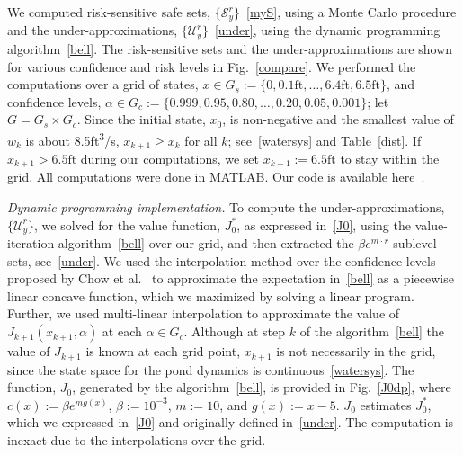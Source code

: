 \documentclass[letterpaper, 10 pt, conference]{ieeeconf}  %
\begin{document}
We computed risk-sensitive safe sets, $\{\mathcal{S}_y^r\}$~\eqref{myS}, using a Monte Carlo procedure 
and the under-approximations, $\{\mathcal{U}_y^r\}$~\eqref{under}, using the dynamic programming algorithm~\eqref{bell}.
The risk-sensitive sets and the under-approximations are shown for various confidence and risk levels in Fig.~\ref{compare}.
We performed the computations over a grid of states, $x \in G_s := \{0, 0.1\text{ft}, \dots, 6.4\text{ft}, 6.5\text{ft}\}$,
and confidence levels, $\alpha \in G_c := \{0.999, 0.95, 0.80, \dots, 0.20, 0.05, 0.001\}$; let $G = G_s \times G_c$.
Since the initial state, $x_0$, is non-negative and the smallest value of $w_k$ is about 8.5ft\textsuperscript{3}/s, 
$x_{k+1}\geq x_k$ for all $k$; see~\eqref{watersys} and Table~\ref{dist}. 
If $x_{k+1} > 6.5\text{ft}$ during our computations, we set $x_{k+1} := 6.5\text{ft}$ to stay within the grid.
All computations were done in MATLAB.\footnotemark 
{}
Our code is available here~\cite{mycode}.

\textit{Dynamic programming implementation.}
To compute the under-approximations, $\{\mathcal{U}_y^r\}$, 
we solved for the value function, $J_0^*$, as expressed in~\eqref{J0},
using the value-iteration algorithm~\eqref{bell} over our grid, and then extracted the $\beta e^{m \cdot r}$-sublevel sets, see~\eqref{under}.
We used the interpolation method over the confidence levels proposed by Chow et al.~\cite{chow2015risk} 
to approximate the expectation in~\eqref{bell}
as a piecewise linear concave function, which we maximized by solving a linear program.\footnotemark
{}
Further, we used multi-linear interpolation to approximate the value of $J_{k+1}(x_{k+1}, \alpha)$ at each $\alpha \in G_c$.
Although at step $k$ of the algorithm~\eqref{bell} the value of $J_{k+1}$ is known at each grid point,
$x_{k+1}$ is not necessarily in the grid, since the state space for the pond dynamics is continuous~\eqref{watersys}.
The function, $J_0$, generated by the algorithm~\eqref{bell}, is provided in Fig.~\ref{J0dp},
where $c(x) := \beta e^{m g(x)}$, $\beta := 10^{-3}$, $m := 10$, and $g(x):= x - 5$.
$J_0$ estimates $J_0^*$, which we expressed in~\eqref{J0} and originally defined in~\eqref{under}.  
The computation is inexact due to the interpolations over the grid.
\end{document}
